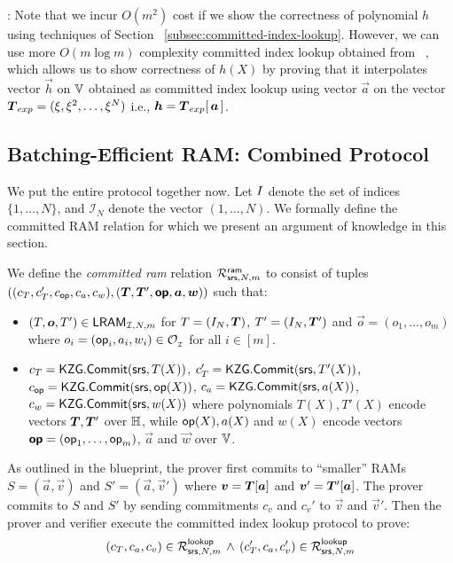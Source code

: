 : Note that we incur $O(m^2)$ cost if we show the correctness of polynomial $h$ using techniques of Section ~\ref{subsec:committed-index-lookup}.
However, we can use more $O(m\log m)$ complexity committed index lookup obtained from ~\cite{EPRINT:EagFioGab22}, which allows us to show correctness of
$h(X)$ by proving that it interpolates vector $\vec{h}$ on $\mathbb{V}$ obtained as committed index lookup using vector $\vec{a}$ on the vector $\vecT_{exp}=(\xi,\xi^2,\ldots,\xi^N)$
i.e., $\vec{h}=\vecT_{exp}[\, \vec{a}\,]$.

\subsection{Batching-Efficient RAM: Combined Protocol}\label{subsec:all-together}
We put the entire protocol together now. Let $I$ denote the set of indices $\{1,\ldots,N\}$, and $\mathcal{I}_N$
denote the vector $(1,\ldots,N)$. We formally define the committed RAM relation for which we present an argument of
knowledge in this section.
\begin{definition}\label{defn:committed-ram}
We define the {\em committed ram} relation
$\mathcal{R}^{\mathsf{ram}}_{\mathsf{srs},N,m}$ to consist of tuples $((c_T, c_T', c_\op, c_a, c_w),(\vecT, \vecT',\vec{\op},\vec{a},\vec{w}))$
such that:
\begin{itemize}[leftmargin=1em]
    \item $(T,\vec{o},T')\in \LRAM{I}{N}{m}$ for $T=(\setind_N,\vecT)$, $T'=(\setind_N,\vecT')$ and $\vec{o}=(o_1,\ldots,o_m)$
    where $o_i=(\mathsf{op}_i, a_i, w_i)\in \mathcal{O}_{{}_\mathcal{I}}$ for all $i\in [m]$.
    \item $c_T=\mathsf{KZG.Commit}(\mathsf{srs}, T(X))$, $c_T'=\mathsf{KZG.Commit}(\mathsf{srs}, T'(X))$, $c_{\mathsf{op}} = \mathsf{KZG.Commit}(\mathsf{srs},\mathsf{op}(X))$,  $c_a=\mathsf{KZG.Commit}(\mathsf{srs}, a(X))$,
    $c_w = \mathsf{KZG.Commit}(\mathsf{srs}, w(X))$ where polynomials $T(X), T'(X)$ encode vectors $\vecT, \vecT'$ over $\mathbb{H}$, while $\mathsf{op}(X), a(X)$ and
    $w(X)$ encode vectors $\vec{\op}=(\op_1,\ldots,\op_m)$, $\vec{a}$ and $\vec{w}$ over $\mathbb{V}$.
\end{itemize}
\end{definition}
As outlined in the blueprint, the prover first commits to ``smaller'' RAMs $S=(\vec{a},\vec{v})$ and $S'=(\vec{a},\vec{v}')$
where $\vec{v}=\vecT[\vec{a}]$ and $\vec{v}'=\vecT'[\vec{a}]$. The prover commits to $S$ and $S'$ by sending commitments
$c_v$ and $c_v'$ to $\vec{v}$ and $\vec{v}'$. Then the prover and verifier execute the committed index lookup protocol to
prove:
\begin{equation}
(c_T, c_a, c_v)\in \mathcal{R}^{\mathsf{lookup}}_{\mathsf{srs},N,m}\, \wedge\, (c_T', c_a, c_v')\in \mathcal{R}^{\mathsf{lookup}}_{\mathsf{srs},N,m}
\end{equation}
